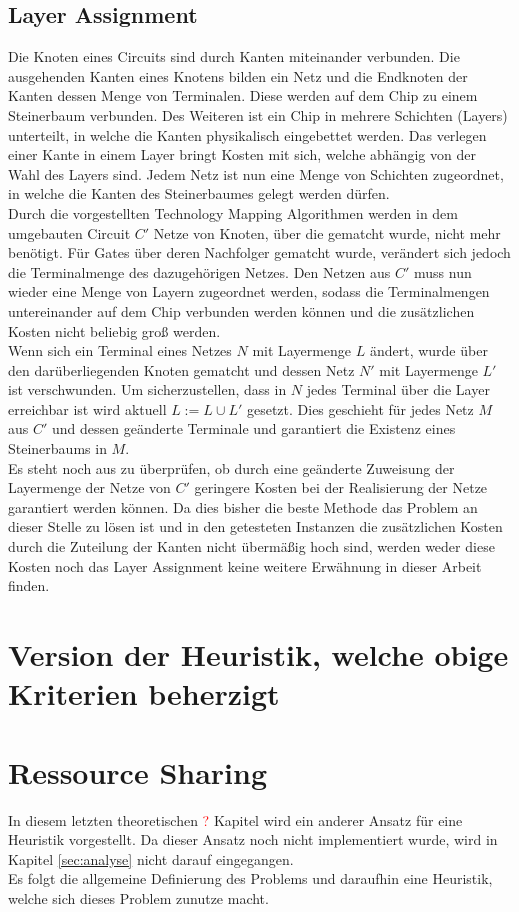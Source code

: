\documentclass[11pt, a4paper, german]{article}
\newcommand{\TM}{Technology Mapping }
\begin{document}
\subsection{Layer Assignment}
Die Knoten eines Circuits sind durch Kanten miteinander verbunden.  Die ausgehenden Kanten eines Knotens bilden ein Netz und  die Endknoten der Kanten dessen Menge von Terminalen. Diese werden auf dem Chip zu einem Steinerbaum verbunden. Des Weiteren ist ein Chip in mehrere Schichten (Layers) unterteilt, in welche die Kanten physikalisch eingebettet werden. Das verlegen einer Kante in einem Layer bringt Kosten mit sich, welche abhängig von der Wahl des Layers sind. Jedem Netz ist nun eine Menge von Schichten zugeordnet, in welche die Kanten des Steinerbaumes gelegt werden dürfen. \\
Durch die vorgestellten \TM Algorithmen  werden in dem umgebauten Circuit $C'$ Netze von Knoten, über die gematcht wurde, nicht mehr benötigt. Für Gates über deren Nachfolger gematcht wurde, verändert sich jedoch die Terminalmenge des dazugehörigen Netzes. Den Netzen aus $C'$ muss nun wieder eine Menge von Layern zugeordnet werden, sodass die  Terminalmengen untereinander auf dem Chip verbunden werden können und die zusätzlichen Kosten nicht beliebig groß werden. \\
Wenn sich ein Terminal eines Netzes $N$ mit Layermenge $L$ ändert, wurde über den darüberliegenden Knoten gematcht und dessen Netz $N'$ mit Layermenge $L'$ ist verschwunden. Um sicherzustellen, dass in $N$ jedes Terminal über die Layer erreichbar ist wird aktuell $L := L \cup L'$ gesetzt. Dies geschieht für jedes Netz $M$ aus $C'$ und dessen geänderte Terminale und garantiert die Existenz eines Steinerbaums in $M$. \\
Es steht noch aus zu überprüfen, ob durch eine geänderte Zuweisung der Layermenge der Netze von $C'$ geringere Kosten bei der Realisierung der Netze garantiert werden können.
Da dies bisher die beste Methode das Problem an dieser Stelle zu lösen ist und in den getesteten Instanzen die zusätzlichen Kosten durch die Zuteilung der Kanten nicht übermäßig hoch sind, werden weder diese Kosten noch das Layer Assignment keine weitere Erwähnung in dieser Arbeit finden.
	
	
\section{Version der Heuristik, welche obige Kriterien beherzigt}
\section{Ressource Sharing}
In diesem letzten theoretischen \textcolor{red}{?} Kapitel wird ein anderer Ansatz für eine Heuristik vorgestellt. Da dieser Ansatz noch nicht implementiert wurde, wird in Kapitel \ref{sec:analyse} nicht darauf eingegangen.\\
Es folgt die allgemeine Definierung des Problems und daraufhin eine Heuristik, welche sich dieses Problem zunutze macht.\\
\end{document}
